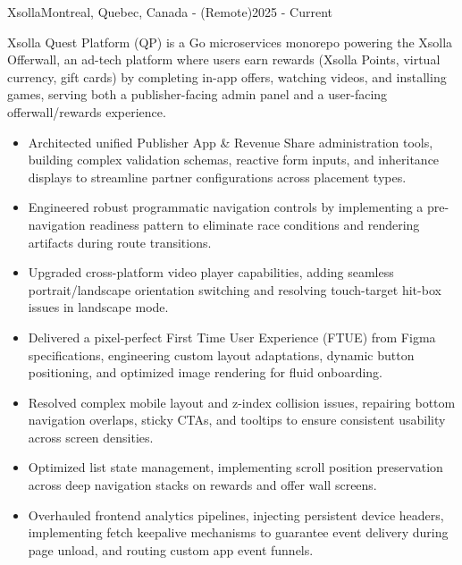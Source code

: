 %
%
%

\begin{projects}
    \project
    {Xsolla}{Montreal, Quebec, Canada - (Remote)}{2025 - Current}
    {}
    {Xsolla Quest Platform (QP) is a Go microservices monorepo powering the Xsolla Offerwall, an ad-tech platform where users earn rewards (Xsolla Points, virtual currency, gift cards) by completing in-app offers, watching videos, and installing games, serving both a publisher-facing admin panel and a user-facing offerwall/rewards experience.
    \begin{itemize}
        \item Architected unified Publisher App \& Revenue Share administration tools, building complex validation schemas, reactive form inputs, and inheritance displays to streamline partner configurations across placement types.
        \item Engineered robust programmatic navigation controls by implementing a pre-navigation readiness pattern to eliminate race conditions and rendering artifacts during route transitions.
        \item Upgraded cross-platform video player capabilities, adding seamless portrait/landscape orientation switching and resolving touch-target hit-box issues in landscape mode.
        \item Delivered a pixel-perfect First Time User Experience (FTUE) from Figma specifications, engineering custom layout adaptations, dynamic button positioning, and optimized image rendering for fluid onboarding.
        \item Resolved complex mobile layout and z-index collision issues, repairing bottom navigation overlaps, sticky CTAs, and tooltips to ensure consistent usability across screen densities.
        \item Optimized list state management, implementing scroll position preservation across deep navigation stacks on rewards and offer wall screens.
        \item Overhauled frontend analytics pipelines, injecting persistent device headers, implementing fetch keepalive mechanisms to guarantee event delivery during page unload, and routing custom app event funnels.

\end{itemize}}
\end{projects}
